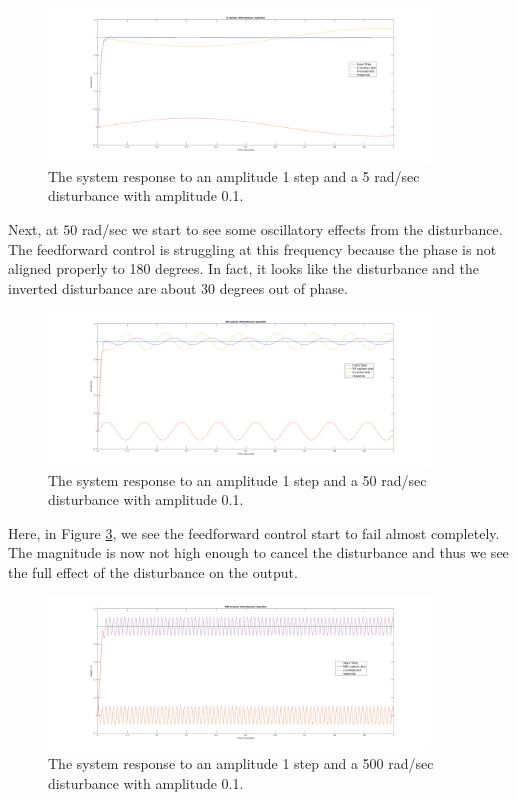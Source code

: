 \documentclass[11pt]{article}
\begin{document}
\begin{figure}[H]
    \centering
    \includegraphics[width=0.9\textwidth]{Dist_5.png}
    \caption{The system response to an amplitude 1 step and a 5 rad/sec disturbance with amplitude 0.1.}
    \label{fig:Dist5radasec}
\end{figure}
Next, at $50$ rad/sec we start to see some oscillatory effects from the disturbance. The feedforward control is struggling at this frequency because the phase is not aligned properly to 180 degrees. In fact, it looks like the disturbance and the inverted disturbance are about 30 degrees out of phase.
\begin{figure}[H]
    \centering
    \includegraphics[width=0.9\textwidth]{Dist_50.png}
    \caption{The system response to an amplitude 1 step and a 50 rad/sec disturbance with amplitude 0.1.}
    \label{fig:Dist50radasec}
\end{figure}
Here, in Figure \ref{fig:Dist500radasec}, we see the feedforward control start to fail almost completely. The magnitude is now not high enough to cancel the disturbance and thus we see the full effect of the disturbance on the output.
\begin{figure}[H]
    \centering
    \includegraphics[width=0.9\textwidth]{Dist_500.png}
    \caption{The system response to an amplitude 1 step and a 500 rad/sec disturbance with amplitude 0.1.}
    \label{fig:Dist500radasec}
\end{figure}
\end{document}
